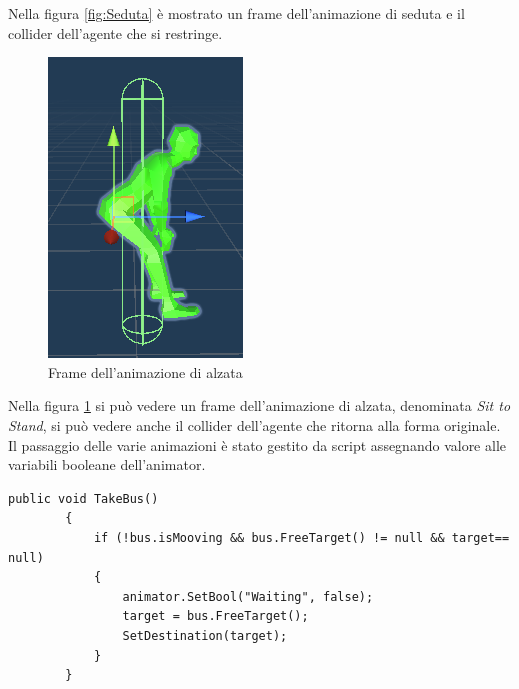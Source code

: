 \documentclass[12pt, openany]{book}
\begin{document}
	Nella figura \ref{fig:Seduta} è mostrato un frame dell'animazione di seduta e il collider dell'agente che si restringe.
	\begin{figure}[H]
		\centering
		\includegraphics[width=0.8\linewidth]{"Immagini/inPiedi.png"}
		\caption{Frame dell'animazione di alzata}
		\label{fig:Alzata}
	\end{figure}
	Nella figura \ref{fig:Alzata} si può vedere un frame dell'animazione di alzata, denominata \emph{Sit to Stand}, si può vedere anche il collider dell'agente che ritorna alla forma originale.\\
	Il passaggio delle varie animazioni è stato gestito da script assegnando valore alle variabili booleane dell'animator.
	\begin{lstlisting}[language={[Sharp]C}, 
		caption={Metodo che permette agli agenti di prendere posto sull'autobus}, label={TakeBus}]
		public void TakeBus()
		{
			if (!bus.isMooving && bus.FreeTarget() != null && target== null)
			{
				animator.SetBool("Waiting", false);
				target = bus.FreeTarget();
				SetDestination(target);
			}
		}
	\end{lstlisting}	
\end{document}
